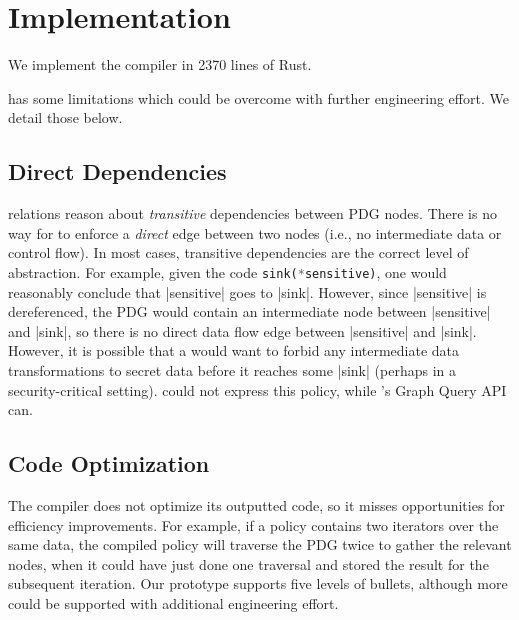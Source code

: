 \chapter{Implementation}
\label{sec:limitations}
We implement the \syslang{} compiler in 2370 lines of Rust.

\syslang{} has some limitations which could be overcome with further engineering effort.
%
We detail those below.

\section{Direct Dependencies}
\syslang{} relations reason about \emph{transitive} dependencies between PDG nodes.
%
There is no way for \ces{} to enforce a \emph{direct} edge between two nodes (i.e., no intermediate data or control flow).
%
In most cases, transitive dependencies are the correct level of abstraction.
%
For example, given the code \lstinline[language=Rust]|sink(*sensitive)|,
one would reasonably conclude that |sensitive| goes to |sink|.
%
However, since |sensitive| is dereferenced, the PDG would contain an intermediate node between |sensitive| and |sink|,
so there is no direct data flow edge between |sensitive| and |sink|.
%
However, it is possible that a \dev{} would want to forbid any intermediate data transformations
to secret data before it reaches some |sink| (perhaps in a security-critical setting).
%
\syslang{} could not express this policy, while \sys{}'s Graph Query API can.

\section{Code Optimization}
The \syslang{} compiler does not optimize its outputted code, so it misses opportunities for efficiency improvements.
%
For example, if a policy contains two iterators over the same data, the \syslang{} compiled policy will traverse the PDG twice to gather the relevant nodes,
when it could have just done one traversal and stored the result for the subsequent iteration.
%
Our \syslang{} prototype supports five levels of bullets, although more could be supported with additional engineering effort.
